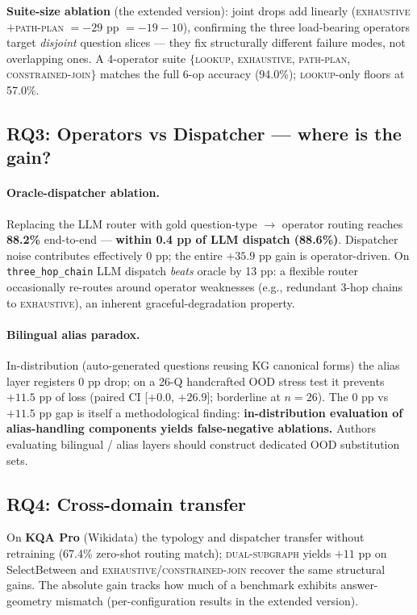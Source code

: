 \documentclass[10pt,a4paper,twocolumn]{article}
\newcommand{\qtype}[1]{\texttt{\small #1}}
\newcommand{\op}[1]{\textsc{\small #1}}
\begin{document}
\textbf{Suite-size ablation} (the extended version): joint drops add linearly (\op{exhaustive}$+$\op{path-plan} $= -29$ pp $= -19{-}10$), confirming the three load-bearing operators target \emph{disjoint} question slices --- they fix structurally different failure modes, not overlapping ones. A 4-operator suite $\{$\op{lookup}, \op{exhaustive}, \op{path-plan}, \op{constrained-join}$\}$ matches the full 6-op accuracy (94.0\%); \op{lookup}-only floors at 57.0\%.

\subsection{RQ3: Operators vs Dispatcher --- where is the gain?}
\label{sec:rq3}

\paragraph{Oracle-dispatcher ablation.}
Replacing the LLM router with gold question-type $\to$ operator routing reaches \textbf{88.2\%} end-to-end --- \textbf{within 0.4 pp of LLM dispatch (88.6\%)}. Dispatcher noise contributes effectively 0 pp; the entire $+35.9$ pp gain is operator-driven. On \qtype{three\_hop\_chain} LLM dispatch \emph{beats} oracle by 13 pp: a flexible router occasionally re-routes around operator weaknesses (e.g., redundant 3-hop chains to \op{exhaustive}), an inherent graceful-degradation property.

\paragraph{Bilingual alias paradox.}
In-distribution (auto-generated questions reusing KG canonical forms) the alias layer registers 0 pp drop; on a 26-Q handcrafted OOD stress test it prevents $+11.5$ pp of loss (paired CI [$+0.0$, $+26.9$]; borderline at $n\!=\!26$). The 0 pp vs $+11.5$ pp gap is itself a methodological finding: \textbf{in-distribution evaluation of alias-handling components yields false-negative ablations.} Authors evaluating bilingual / alias layers should construct dedicated OOD substitution sets.

\subsection{RQ4: Cross-domain transfer}
\label{sec:rq4}
On \textbf{KQA Pro} (Wikidata) the typology and dispatcher transfer without retraining (67.4\% zero-shot routing match); \op{dual-subgraph} yields $+11$ pp on SelectBetween and \op{exhaustive}/\op{constrained-join} recover the same structural gains. The absolute gain tracks how much of a benchmark exhibits answer-geometry mismatch (per-configuration results in the extended version).
\end{document}
